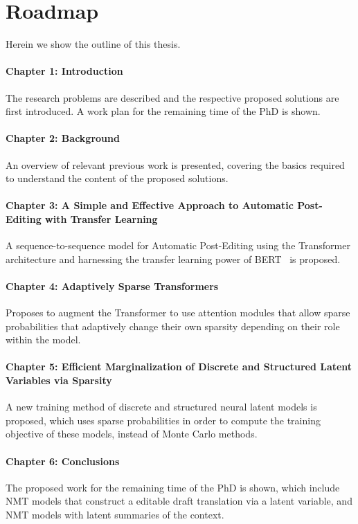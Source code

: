 \section{Roadmap}
\label{sec:int_roadmap}

Herein we show the outline of this thesis.

\paragraph*{Chapter 1: Introduction} The research problems are
described and the respective proposed solutions are first introduced.
A work plan for the remaining time of the PhD is shown.

\paragraph*{Chapter 2: Background} An overview of relevant previous
work is presented, covering the basics required to understand
the content of the proposed solutions.

\paragraph*{Chapter 3: A Simple and Effective Approach to Automatic
    Post-Editing with Transfer Learning} A sequence-to-sequence model for
Automatic Post-Editing using the Transformer architecture and
harnessing the transfer learning power of BERT~\citep{devlin2018bert}
is proposed.

\paragraph*{Chapter 4: Adaptively Sparse Transformers} Proposes to
augment the Transformer to use attention modules that allow sparse
probabilities that adaptively change their own sparsity depending on
their role within the model.

\paragraph*{Chapter 5: Efficient Marginalization of Discrete and
    Structured Latent Variables via Sparsity} A new training method of
discrete and structured neural latent models is proposed, which uses
sparse probabilities in order to compute the training objective of
these models, instead of Monte Carlo methods.

\paragraph*{Chapter 6: Conclusions} The proposed work for the
remaining time of the PhD is shown, which include NMT models that
construct a editable draft translation via a latent variable, and
NMT models with latent summaries of the context.